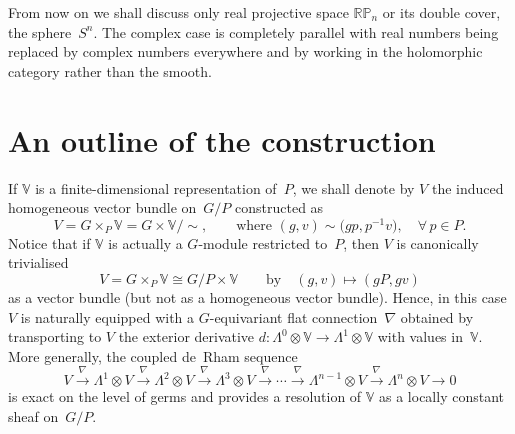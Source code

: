 From now on we shall discuss only real projective space ${\mathbb{RP}}_n$ or
its double cover, the sphere~$S^n$. The complex case is completely parallel
with real numbers being replaced by complex numbers everywhere and by working
in the holomorphic category rather than the smooth.

\section{An outline of the construction}\label{outline}

If ${\mathbb{V}}$ is a f\/inite-dimensional representation of~$P$, we shall
denote by $V$ the induced homogeneous vector bundle on~$G/P$ constructed as
\[V=G\times_P{\mathbb{V}}=G\times{\mathbb{V}}/\sim,
\qquad\mbox{where }(g,v)\sim\big(g p,p^{-1}v\big),\quad \forall\, p\in P.\]
Notice that if ${\mathbb{V}}$ is actually a $G$-module restricted to~$P$, then
$V$ is canonically trivialised
\begin{equation}\label{twist}
V=G\times_P{\mathbb{V}}\cong G/P\times{\mathbb{V}}\qquad\mbox{by}\quad
(g,v)\mapsto(gP,g v)\end{equation}
as a vector bundle (but not as a homogeneous vector bundle). Hence, in this
case $V$ is naturally equipped with a $G$-equivariant f\/lat connection~$\nabla$
obtained by transporting to $V$ the exterior derivative
$d:\Lambda^0\otimes{\mathbb{V}}\to\Lambda^1\otimes{\mathbb{V}}$ with
values in~${\mathbb{V}}$. More generally, the coupled de~Rham sequence
\begin{equation}\label{coupled}V\xrightarrow{\,\nabla\,}\Lambda^1\otimes V
\xrightarrow{\,\nabla\,}\Lambda^2\otimes V
\xrightarrow{\,\nabla\,}\Lambda^3\otimes V \xrightarrow{\,\nabla\,}\cdots
\xrightarrow{\,\nabla\,}\Lambda^{n-1}\otimes V
\xrightarrow{\,\nabla\,}\Lambda^n\otimes V\to 0\end{equation} is exact on the
level of germs and provides a resolution of ${\mathbb{V}}$ as a locally
constant sheaf on~$G/P$.

